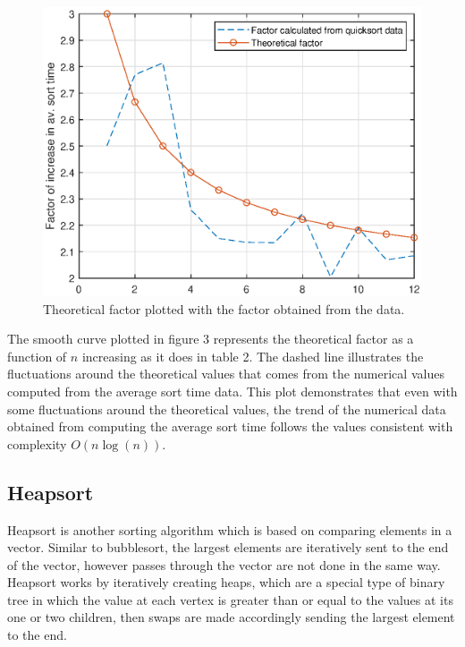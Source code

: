 \documentclass[a4paper, 12pt]{article}
\begin{document}
\begin{figure}[H]
\centering
\includegraphics[scale=0.75]{quicksort_factor}
\caption{Theoretical factor plotted with the factor obtained from the data.}
\end{figure}
The smooth curve plotted in figure 3 represents the theoretical factor as a function of $n$ increasing as it does in table 2. The dashed line illustrates the fluctuations around the theoretical values that comes from the numerical values computed from the average sort time data. This plot demonstrates that even with some fluctuations around the theoretical values, the trend of the numerical data obtained from computing the average sort time follows the values consistent with complexity $O(n\log(n))$.    


\subsection{Heapsort}

Heapsort is another sorting algorithm which is based on comparing elements in a vector. Similar to bubblesort, the largest elements are iteratively sent to the end of the vector, however passes through the vector are not done in the same way. Heapsort works by iteratively creating heaps, which are a special type of binary tree in which the value at each vertex is greater than or equal to the values at its one or two children, then swaps are made accordingly sending the largest element to the end. \\
\end{document}
